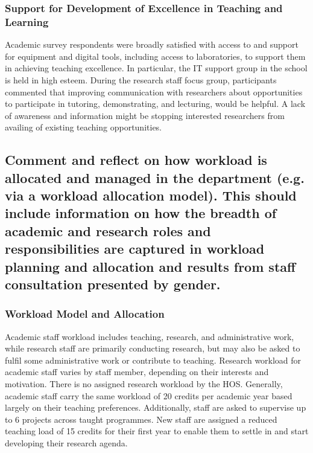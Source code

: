 \subsubsection{Support for Development of Excellence in Teaching and Learning}
Academic survey respondents  were broadly satisfied with access to and support for equipment and digital tools, including access to laboratories, to support them in achieving teaching excellence. In particular, the IT support group in the school is held in high esteem. %
During the research staff focus group, participants commented that improving communication with researchers about opportunities to participate in tutoring, demonstrating, and lecturing, would be helpful. 
A lack of awareness and information might be stopping interested researchers from availing of existing teaching opportunities.


\subsection{Comment and reflect on how workload is allocated and managed in the department (e.g. via a workload allocation model). This should include information on how the breadth of academic and research roles and responsibilities are captured in workload planning and allocation and results from staff consultation presented by gender.}\label{sub:workload}

\subsubsection{Workload Model and Allocation}

Academic staff workload includes teaching, research, and administrative work, while research staff are primarily conducting research, but may also be asked to fulfil some administrative work or contribute to teaching.
Research workload for academic staff varies by staff member, depending on their interests and motivation. There is no assigned research workload by the \ac{HOS}. 
Generally, academic staff carry the same workload of 20 credits per academic year based largely on their teaching preferences. Additionally, staff are asked to supervise up to 6 projects across taught programmes. 
New staff are assigned a reduced teaching load of 15 credits for their first year to enable them to settle in and start developing their research agenda.

